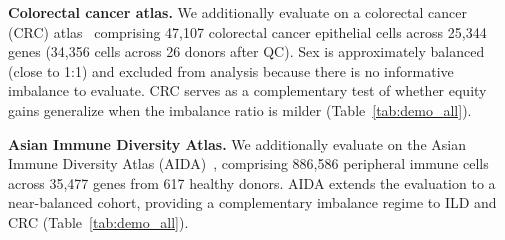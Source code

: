 \documentclass[sigconf]{acmart}
\begin{document}
\textbf{Colorectal cancer atlas.} We additionally evaluate on a colorectal 
cancer (CRC) atlas~\cite{moorman2024crc} comprising 47{,}107 colorectal cancer 
epithelial cells across 25{,}344 genes (34{,}356 cells across 26 donors after QC). Sex is approximately balanced (close 
to 1:1) and excluded from analysis because there is no informative imbalance 
to evaluate. CRC serves as a complementary test of whether equity gains generalize when the imbalance ratio is milder (Table~\ref{tab:demo_all}).

\textbf{Asian Immune Diversity Atlas.} We additionally evaluate on the Asian 
Immune Diversity Atlas (AIDA)~\cite{kock2025aida}, comprising 886{,}586 
peripheral immune cells across 35{,}477 genes from 617 healthy donors. AIDA extends the evaluation to a near-balanced 
cohort, providing a complementary imbalance regime to ILD and CRC 
(Table~\ref{tab:demo_all}).
\end{document}
